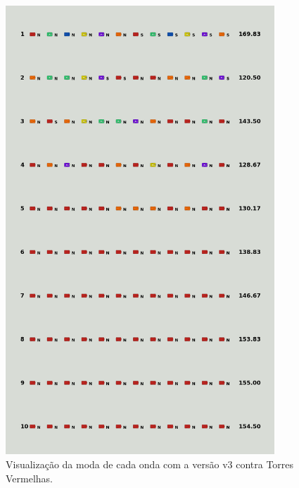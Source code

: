 \begin{figure}[H]
  \centering
  \includegraphics[width=0.9\textwidth]{figuras/td/td_allred_ai_mode_3_1.png}
  \caption{Visualização da moda de cada onda com a versão v3 contra Torres Vermelhas.}
  \label{fig:td-moda-red-3-1}
\end{figure}

